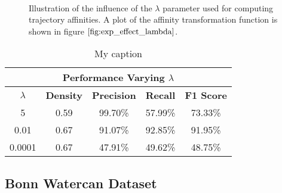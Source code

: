 \begin{figure}[H]
\begin{center}

~
~
\end{center}
\caption[Influence varying $\lambda$]{Illustration of the influence of the $\lambda$ parameter used for computing trajectory affinities. A plot of the affinity transformation function is shown in figure $\ref{fig:exp_effect_lambda}$. }
\label{fig:cars_dataset_lambdas}
\end{figure}


\begin{table}[H]
\centering
\begin{tabular}{|c|c|c|c|c|}
\hline
\multicolumn{5}{|c|}{Performance Varying $\lambda$}                        \\ \hline
$\lambda$              & \textbf{Density} & \textbf{Precision} & \textbf{Recall} & \textbf{F1 Score} \\ \hline
5 & 0.59 & 99.70\%   & 57.99\%     & 73.33\%  \\ \hline
0.01 & 0.67 & 91.07\%   & 92.85\%     & 91.95\%  \\ \hline              
0.0001 & 0.67 & 47.91\%   & 49.62\%     & 48.75\%  \\ \hline
\end{tabular}
\caption[Cars Varying $\lambda$]{My caption}
\label{tab:cars_varying_lambas}
\end{table}




\subsection{Bonn Watercan Dataset}

